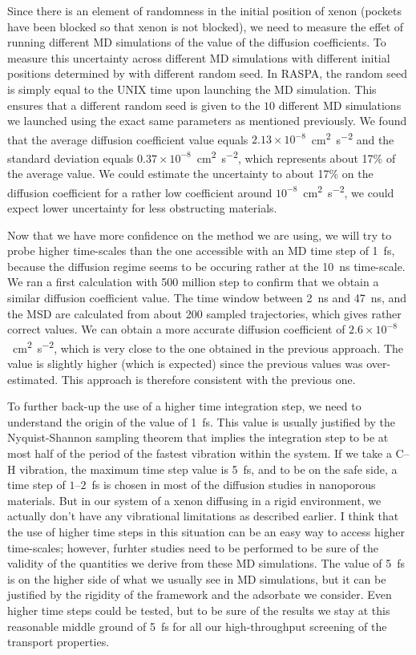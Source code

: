 \documentclass[main]{subfiles}
\begin{document}
Since there is an element of randomness in the initial position of xenon (pockets have been blocked so that xenon is not blocked), we need to measure the effet of running different MD simulations of the value of the diffusion coefficients. To measure this uncertainty across different MD simulations with different initial positions determined by with different random seed. In RASPA, the random seed is simply equal to the UNIX time upon launching the MD simulation. This ensures that a different random seed is given to the $10$ different MD simulations we launched using the exact same parameters as mentioned previously. We found that the average diffusion coefficient value equals $2.13\times 10^{-8}$~\si{\square\cm\per\square\s} and the standard deviation equals $0.37\times 10^{-8}$~\si{\square\cm\per\square\s}, which represents about {17\%} of the average value. We could estimate the uncertainty to about {17\%} on the diffusion coefficient for a rather low coefficient around $10^{-8}$~\si{\square\cm\per\square\s}, we could expect lower uncertainty for less obstructing materials. 

Now that we have more confidence on the method we are using, we will try to probe higher time-scales than the one accessible with an MD time step of \SI{1}{\fs}, because the diffusion regime seems to be occuring rather at the \SI{10}{\ns} time-scale. We ran a first calculation with 500 million step to confirm that we obtain a similar diffusion coefficient value. The time window between \SI{2}{\ns} and \SI{47}{\ns}, and the MSD are calculated from about 200 sampled trajectories, which gives rather correct values. We can obtain a more accurate diffusion coefficient of $2.6\times 10^{-8}$~\si{\square\cm\per\square\s}, which is very close to the one obtained in the previous approach. The value is slightly higher (which is expected) since the previous values was over-estimated. This approach is therefore consistent with the previous one.

To further back-up the use of a higher time integration step, we need to understand the origin of the value of \SI{1}{\fs}. This value is usually justified by the Nyquist-Shannon sampling theorem that implies the integration step to be at most half of the period of the fastest vibration within the system. If we take a C--H vibration, the maximum time step value is \SI{5}{\fs}, and to be on the safe side, a time step of $1$--$2$~\si{\fs} is chosen in most of the diffusion studies in nanoporous materials.\autocite{Bukowski_2021} But in our system of a xenon diffusing in a rigid environment, we actually don't have any vibrational limitations as described earlier. I think that the use of higher time steps in this situation can be an easy way to access higher time-scales; however, furhter studies need to be performed to be sure of the validity of the quantities we derive from these MD simulations. The value of \SI{5}{\fs} is on the higher side of what we usually see in MD simulations, but it can be justified by the rigidity of the framework and the adsorbate we consider. Even higher time steps could be tested, but to be sure of the results we stay at this reasonable middle ground of \SI{5}{\fs} for all our high-throughput screening of the transport properties.
\end{document}
